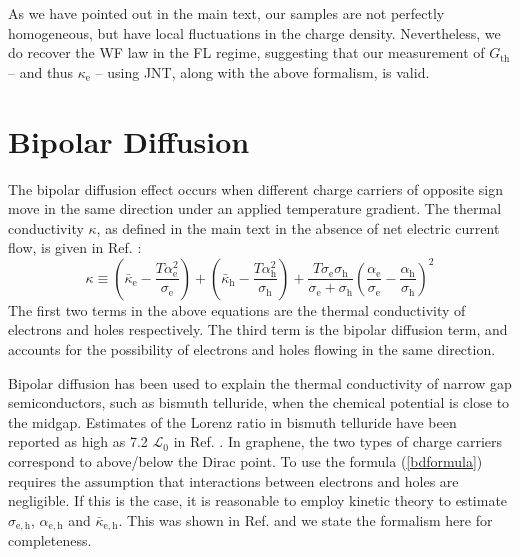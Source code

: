 \documentclass[10pt, oneside]{book}
\begin{document}
\begin{doublespace}
\begin{appendix}
As we have pointed out in the main text,  our samples are not perfectly homogeneous, but have local fluctuations in the charge density.   Nevertheless, we do recover the WF law in the FL regime, suggesting that our measurement of $G_{\mathrm{th}}$ -- and thus $\kappa_{\mathrm{e}}$ -- using JNT, along with the above formalism, is valid.

\section{Bipolar Diffusion }
The bipolar diffusion effect occurs when different charge carriers of opposite sign move in the same direction under an applied temperature gradient. The thermal conductivity $\kappa$,  as defined in the main text in the absence of net electric current flow, is given in Ref. \cite{goldsmid}:
\begin{equation}
\kappa \equiv \left(\bar\kappa_{\mathrm{e}} - \frac{T\alpha_{\mathrm{e}}^2}{\sigma_{\mathrm{e}}}\right) + \left(\bar\kappa_{\mathrm{h}} - \frac{T\alpha_{\mathrm{h}}^2}{\sigma_{\mathrm{h}}}\right) + \frac{T\sigma_{\mathrm{e}}\sigma_{\mathrm{h}}}{\sigma_{\mathrm{e}}+\sigma_{\mathrm{h}}}\left(\frac{\alpha_{\mathrm{e}}}{\sigma_{\mathrm{e}}}-\frac{\alpha_{\mathrm{h}}}{\sigma_{\mathrm{h}}}\right)^2  \label{bdformula}
\end{equation}
The first two terms in the above equations are the thermal conductivity of electrons and holes respectively. The third term is the bipolar diffusion term, and accounts for the possibility of electrons and holes flowing in the same direction.


Bipolar diffusion has been used to explain the thermal conductivity of narrow gap semiconductors, such as bismuth telluride, when the chemical potential is close to the midgap. Estimates of the Lorenz ratio in bismuth telluride have been reported as high as 7.2 $\mathcal{L}_0$  in Ref. \cite{GOLDSMID:1956cs}.   In graphene, the two types of charge carriers correspond to above/below the Dirac point.  To use the formula (\ref{bdformula}) requires the assumption that interactions between electrons and holes are negligible. If this is the case, it is reasonable to employ kinetic theory to estimate $\sigma_{\mathrm{e,h}}$, $\alpha_{\mathrm{e,h}}$ and $\bar\kappa_{\mathrm{e,h}}$.  This was shown in Ref. \cite{yoshino} and we state the formalism here for completeness.


\end{appendix}
\end{doublespace}
\end{document}
